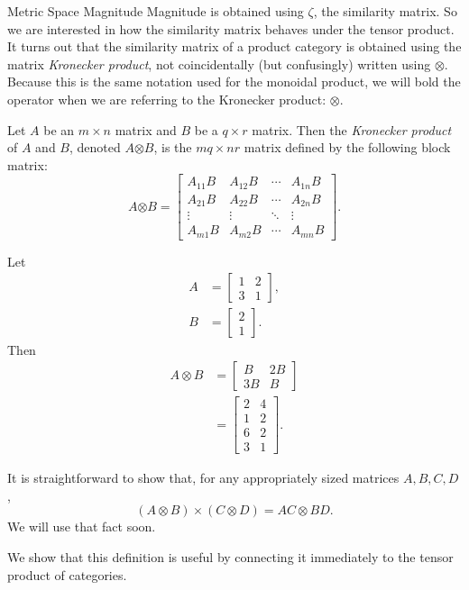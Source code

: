 \documentclass[12pt]{pom_thesis}
\newcommand{\kron}{\boldsymbol{\otimes}}
\begin{document}
\begin{chapter}{Metric Space Magnitude}
Magnitude is obtained using $\zeta$, the similarity matrix. So we are interested in how the similarity matrix behaves under the tensor product. It turns out that the similarity matrix of a product category is obtained using the matrix \emph{Kronecker product}, not coincidentally (but confusingly) written using $\otimes$. Because this is the same notation used for the monoidal product, we will bold the operator when we are referring to the Kronecker product: $\kron$.
\begin{defn}
Let $A$ be an $m \times n$ matrix and $B$ be a $q \times r$ matrix. Then the \emph{Kronecker product} of $A$ and $B$, denoted $A \kron B$, is the $mq \times nr$ matrix defined by the following block matrix:
\[
A \kron B = 
\begin{bmatrix}
A_{11}B & A_{12}B & \cdots & A_{1n}B \\
A_{21}B & A_{22}B & \cdots & A_{2n}B \\
\vdots & \vdots & \ddots & \vdots \\
A_{m1}B & A_{m2}B & \cdots & A_{mn}B
\end{bmatrix}.
\]
\end{defn}
\begin{examp}
Let 
\begin{align*}
A &= \begin{bmatrix}
1 & 2 \\
3 & 1
\end{bmatrix},\\
B &= \begin{bmatrix}
2  \\
1 
\end{bmatrix}.
\end{align*}
Then
\begin{align*}
A \otimes B &= 
\begin{bmatrix}
B & 2B\\
3B & B
\end{bmatrix}\\
&= \begin{bmatrix}
2 & 4 \\
1 & 2 \\
6 & 2\\
3 & 1
\end{bmatrix}.
\end{align*}
\end{examp}
\begin{rmk}\label{kron_prod}
It is straightforward to show that, for any appropriately sized matrices $A, B, C, D$,
\[
(A \otimes B) \times (C \otimes D) = AC \otimes BD.
\]
We will use that fact soon.
\end{rmk}
We show that this definition is useful by connecting it immediately to the tensor product of categories.


\end{chapter}
\end{document}
